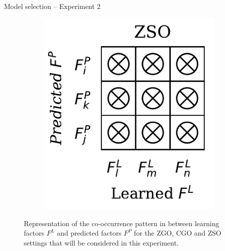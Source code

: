 \begin{frame}{Model selection -- Experiment 2}
\begin{figure}[H]
\begin{subfigure}[b]{0.17\textwidth}
        \end{subfigure}
        \hfill
        \begin{subfigure}[b]{0.17\textwidth}
            \includegraphics[width=\textwidth]{img/msel/_ZSO.pdf}
        \end{subfigure}
        
        \caption{Representation of the co-occurrence pattern in between learning factors $F^L$ and predicted
        factors $F^P$ for the ZGO, CGO and ZSO settings that will be considered in this experiment.
        }
    \end{figure}

\end{frame}
	
